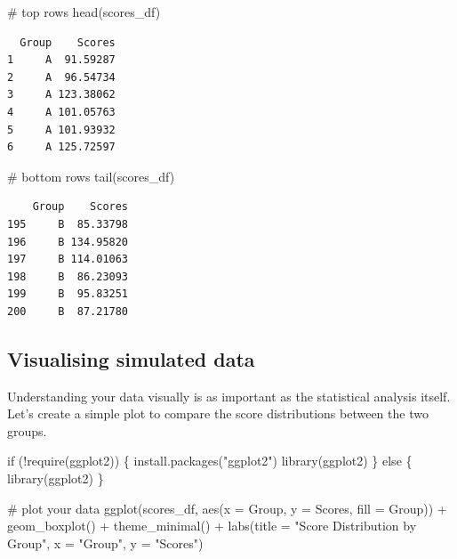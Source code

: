 \documentclass[
  singlecolumn]{article}
\newenvironment{Shaded}{}{}
\newcommand{\AttributeTok}[1]{\textcolor[rgb]{0.84,0.23,0.29}{#1}}
\newcommand{\CommentTok}[1]{\textcolor[rgb]{0.42,0.45,0.49}{#1}}
\newcommand{\ControlFlowTok}[1]{\textcolor[rgb]{0.84,0.23,0.29}{#1}}
\newcommand{\FunctionTok}[1]{\textcolor[rgb]{0.44,0.26,0.76}{#1}}
\newcommand{\NormalTok}[1]{\textcolor[rgb]{0.14,0.16,0.18}{#1}}
\newcommand{\SpecialCharTok}[1]{\textcolor[rgb]{0.00,0.36,0.77}{#1}}
\newcommand{\StringTok}[1]{\textcolor[rgb]{0.01,0.18,0.38}{#1}}
\theoremstyle{definition}
\theoremstyle{remark}
\begin{document}
\begin{Shaded}
\begin{Highlighting}[]
\CommentTok{\# top rows}
\FunctionTok{head}\NormalTok{(scores\_df)}
\end{Highlighting}
\end{Shaded}

\begin{verbatim}
  Group    Scores
1     A  91.59287
2     A  96.54734
3     A 123.38062
4     A 101.05763
5     A 101.93932
6     A 125.72597
\end{verbatim}

\begin{Shaded}
\begin{Highlighting}[]
\CommentTok{\# bottom rows}
\FunctionTok{tail}\NormalTok{(scores\_df)}
\end{Highlighting}
\end{Shaded}

\begin{verbatim}
    Group    Scores
195     B  85.33798
196     B 134.95820
197     B 114.01063
198     B  86.23093
199     B  95.83251
200     B  87.21780
\end{verbatim}

\subsection{Visualising simulated
data}\label{visualising-simulated-data}

Understanding your data visually is as important as the statistical
analysis itself. Let's create a simple plot to compare the score
distributions between the two groups.

\begin{Shaded}
\begin{Highlighting}[]
\ControlFlowTok{if}\NormalTok{ (}\SpecialCharTok{!}\FunctionTok{require}\NormalTok{(ggplot2)) \{}
  \FunctionTok{install.packages}\NormalTok{(}\StringTok{"ggplot2"}\NormalTok{)}
  \FunctionTok{library}\NormalTok{(ggplot2)}
\NormalTok{\} }\ControlFlowTok{else}\NormalTok{ \{}
  \FunctionTok{library}\NormalTok{(ggplot2)}
\NormalTok{\}}

\CommentTok{\# plot your data}
\FunctionTok{ggplot}\NormalTok{(scores\_df, }\FunctionTok{aes}\NormalTok{(}\AttributeTok{x =}\NormalTok{ Group, }\AttributeTok{y =}\NormalTok{ Scores, }\AttributeTok{fill =}\NormalTok{ Group)) }\SpecialCharTok{+}
  \FunctionTok{geom\_boxplot}\NormalTok{() }\SpecialCharTok{+}
  \FunctionTok{theme\_minimal}\NormalTok{() }\SpecialCharTok{+}
  \FunctionTok{labs}\NormalTok{(}\AttributeTok{title =} \StringTok{"Score Distribution by Group"}\NormalTok{, }\AttributeTok{x =} \StringTok{"Group"}\NormalTok{, }\AttributeTok{y =} \StringTok{"Scores"}\NormalTok{)}
\end{Highlighting}
\end{Shaded}
\end{document}
